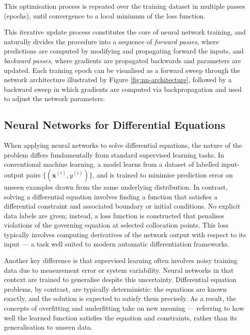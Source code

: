 This optimisation process is repeated over the training dataset in multiple passes 
(epochs), until convergence to a local minimum of the loss function.

This iterative update process constitutes the core of neural network training, and naturally 
divides the procedure into a sequence of \emph{forward passes}, where predictions are computed 
by modifying and propagating forward the inputs, 
and \emph{backward passes}, where gradients are propagated backwards and parameters are updated. Each 
training epoch can be visualised as a forward sweep through the network architecture illustrated
by Figure \ref{fig:nn-architecture}, followed by a backward sweep in which gradients are 
computed via backpropagation and used to adjust the network parameters.

\subsection{Neural Networks for Differential Equations}

When applying neural networks to solve differential equations, the nature of the problem differs 
fundamentally from standard supervised learning tasks. In conventional machine learning, a model 
learns from a dataset of labelled input-output pairs 
\( \{ (\mathbf{x}^{(i)}, y^{(i)}) \} \), and is trained to minimise prediction error on unseen
examples drawn from the same underlying distribution. In contrast, solving a differential equation 
involves finding a function that satisfies a differential constraint and associated boundary or 
initial conditions. No explicit data labels are given; instead, a loss function is constructed that 
penalises violations of the governing equation at selected collocation points. This loss typically 
involves computing derivatives of the network output with respect to its input — a task well suited 
to modern automatic differentiation frameworks.

Another key difference is that supervised learning often involves noisy training data due to 
measurement error or system variability. Neural networks in that context are trained to generalise 
despite this uncertainty. Differential equation problems, by contrast, are typically deterministic: 
the equations are known exactly, and the solution is expected to satisfy them precisely. As a result, 
the concepts of overfitting and underfitting take on new meaning — referring to how well the learned 
function satisfies the equation and constraints, rather than its generalisation to unseen data.

